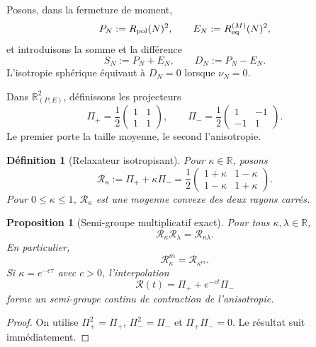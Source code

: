 \documentclass[11pt,a4paper]{article}
\newtheorem{proposition}[theorem]{Proposition}
\newtheorem{definition}[theorem]{Définition}
\newcommand{\R}{\mathbb R}
\begin{document}
Posons, dans la fermeture de moment,
\begin{equation}\label{eq:v9-PE}
 P_N:=R_{\rm pol}(N)^2,
 \qquad
 E_N:=R_{\rm eq}^{(M)}(N)^2,
\end{equation}
et introduisons la somme et la différence
\begin{equation}\label{eq:v9-sd}
 S_N:=P_N+E_N,
 \qquad
 D_N:=P_N-E_N.
\end{equation}
L'isotropie sphérique équivaut à $D_N=0$ lorsque $\nu_N=0$.

Dans $\R^2_{(P,E)}$, définissons les projecteurs
\begin{equation}\label{eq:v9-projectors}
 \Pi_+=\frac12
 \begin{pmatrix}1&1\\1&1\end{pmatrix},
 \qquad
 \Pi_-=\frac12
 \begin{pmatrix}1&-1\\-1&1\end{pmatrix}.
\end{equation}
Le premier porte la taille moyenne, le second l'anisotropie.

\begin{definition}[Relaxateur isotropisant]\label{def:v9-relaxer}
Pour $\kappa\in\R$, posons
\begin{equation}\label{eq:v9-Rk}
 \boxed{
 \mathcal R_\kappa:=\Pi_++\kappa\Pi_-
 =\frac12
 \begin{pmatrix}
 1+\kappa&1-\kappa\\
 1-\kappa&1+\kappa
 \end{pmatrix}.}
\end{equation}
Pour $0\le\kappa\le1$, $\mathcal R_\kappa$ est une moyenne convexe des deux rayons carrés.
\end{definition}

\begin{proposition}[Semi-groupe multiplicatif exact]\label{prop:v9-relax-semigroup}
Pour tous $\kappa,\lambda\in\R$,
\begin{equation}\label{eq:v9-semigroup}
 \boxed{\mathcal R_\kappa\mathcal R_\lambda
 =\mathcal R_{\kappa\lambda}.}
\end{equation}
En particulier,
\[
 \mathcal R_\kappa^m=\mathcal R_{\kappa^m}.
\]
Si $\kappa=e^{-c\tau}$ avec $c>0$, l'interpolation
\[
 \mathcal R(t)=\Pi_++e^{-ct}\Pi_-
\]
forme un semi-groupe continu de contraction de l'anisotropie.
\end{proposition}

\begin{proof}
On utilise $\Pi_+^2=\Pi_+$, $\Pi_-^2=\Pi_-$ et $\Pi_+\Pi_-=0$. Le résultat suit immédiatement.
\end{proof}
\end{document}
